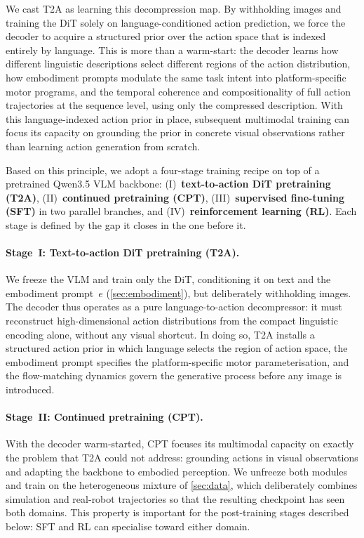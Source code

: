 \documentclass{article}
\begin{document}
We cast T2A as learning this decompression map.
By withholding images and training the DiT solely on language-conditioned
action prediction, we force the decoder to acquire a structured prior over the
action space that is indexed entirely by language.
This is more than a warm-start: the decoder learns how different linguistic descriptions select different regions of the
action distribution, how embodiment prompts modulate the same task intent into
platform-specific motor programs, and the temporal coherence and compositionality of full action trajectories
at the sequence level, using only the compressed description.
With this language-indexed action prior in place, subsequent multimodal
training can focus its capacity on grounding the prior in concrete visual
observations rather than learning action generation from scratch.

Based on this principle, we adopt a four-stage training recipe on top of a
pretrained Qwen3.5 VLM backbone:
(I)~\textbf{text-to-action DiT pretraining (T2A)},
(II)~\textbf{continued pretraining (CPT)},
(III)~\textbf{supervised fine-tuning (SFT)} in two parallel branches, and
(IV)~\textbf{reinforcement learning (RL)}.
Each stage is defined by the gap it closes in the one before it.




\paragraph{Stage~I: Text-to-action DiT pretraining (T2A).}
We freeze the VLM and train only the DiT, conditioning it on text and the
  embodiment prompt~$e$ (\cref{sec:embodiment}), but deliberately withholding
  images.
  The decoder thus operates as a pure language-to-action decompressor: it
  must reconstruct high-dimensional action distributions from the compact
  linguistic encoding alone, without any visual shortcut.
  In doing so, T2A installs a structured action prior in which language
  selects the region of action space, the embodiment prompt specifies the
  platform-specific motor parameterisation, and the flow-matching dynamics
  govern the generative process before any image is introduced.


  \paragraph{Stage~II: Continued pretraining (CPT).}
  With the decoder warm-started, CPT focuses its multimodal capacity on exactly
  the problem that T2A could not address: grounding actions in visual
  observations and adapting the backbone to embodied perception.
  We unfreeze both modules and train on the heterogeneous mixture of
  \cref{sec:data}, which deliberately combines simulation and real-robot
  trajectories so that the resulting checkpoint has seen
  both domains.
  This property is important for the post-training stages described below:
  SFT and RL can specialise toward either domain.
\end{document}
